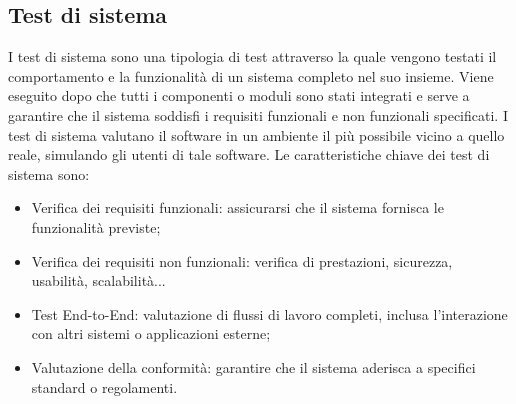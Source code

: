 \subsection{Test di sistema}
I test di sistema sono una tipologia di test attraverso la quale vengono testati il comportamento e la funzionalità di un sistema completo nel suo insieme. Viene eseguito dopo che tutti i componenti o moduli sono stati integrati e serve a garantire che il sistema soddisfi i requisiti funzionali e non funzionali specificati. I test di sistema valutano il software in un ambiente il più possibile vicino a quello reale, simulando gli utenti di tale software. Le caratteristiche chiave dei test di sistema sono:
\begin{itemize}
    \item Verifica dei requisiti funzionali: assicurarsi che il sistema fornisca le funzionalità previste;
    \item Verifica dei requisiti non funzionali: verifica di prestazioni, sicurezza, usabilità, scalabilità...
    \item Test End-to-End: valutazione di flussi di lavoro completi, inclusa l'interazione con altri sistemi o applicazioni esterne;
    \item Valutazione della conformità: garantire che il sistema aderisca a specifici standard o regolamenti.
\end{itemize}
